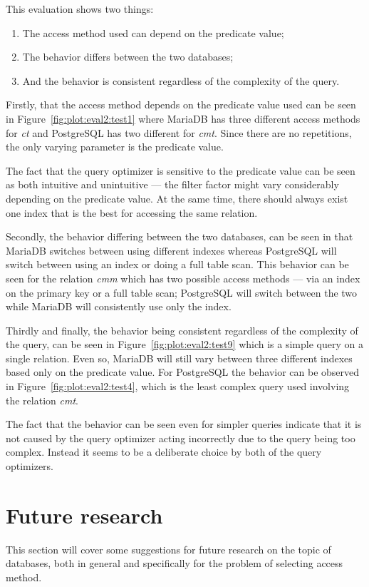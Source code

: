 This evaluation shows two things:
\begin{enumerate}
\item The access method used can depend on the predicate value;
\item The behavior differs between the two databases;
\item And the behavior is consistent regardless of the complexity of the query.
\end{enumerate}

Firstly, that the access method depends on the predicate value used can be seen in
Figure~\ref{fig:plot:eval2:test1} where MariaDB has three different access
methods for \textit{ct} and PostgreSQL has two different for \textit{cmt}. Since
there are no repetitions, the only varying parameter is the predicate value.

The fact that the query optimizer is sensitive to the predicate value can be seen as
both intuitive and unintuitive --- the filter factor might vary considerably
depending on the predicate value. At the same time, there should always exist
one index that is the best for accessing the same relation.

Secondly, the behavior differing between the two databases, can be seen in that
MariaDB switches between using different indexes whereas PostgreSQL will
switch between using an index or doing a full table scan. This behavior can be
seen for the relation \textit{cmm} which has two possible access methods --- via
an index on the primary key or a full table scan; PostgreSQL will switch between
the two while MariaDB will consistently use only the index.

Thirdly and finally, the behavior being consistent regardless of the complexity
of the query, can be seen in Figure~\ref{fig:plot:eval2:test9} which is a simple
query on a single relation. Even so, MariaDB will still vary between three
different indexes based only on the predicate value. For PostgreSQL the behavior
can be observed in Figure~\ref{fig:plot:eval2:test4}, which is the least complex
query used involving the relation \textit{cmt}.

The fact that the behavior can be seen even for simpler queries indicate that it
is not caused by the query optimizer acting incorrectly due to the query being
too complex. Instead it seems to be a deliberate choice by both of the query
optimizers.

\section{Future research}
This section will cover some suggestions for future research on the topic of
databases, both in general and specifically for the problem of selecting access method.

